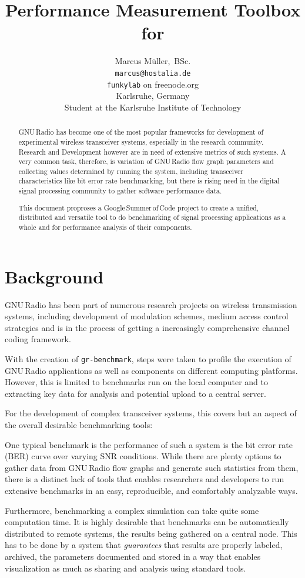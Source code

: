 \documentclass[a4paper]{IEEEtran}
\author{Marcus Müller,~BSc. \\[1.2em]%
{\scriptsize \texttt{marcus@hostalia.de}\\%
\texttt{funkylab} on freenode.org}\\[1.2em]%
%
{\footnotesize Karlsruhe, Germany\\Student at the Karlsruhe Institute of Technology}}
\title{Performance Measurement Toolbox for \gr}
\newcommand{\gr}{GNU\,Radio\xspace}
\newcommand{\gsoc}{Google\,Summer\,of\,Code\xspace}
\newcommand{\grbench}{\texttt{gr-benchmark}\xspace}
\begin{document}
\maketitle

\begin{abstract} \gr has become one of the most popular frameworks for
development of experimental wireless transceiver systems, especially in the
research community. Research and Development however are in need of extensive
metrics of such systems. A very common task, therefore, is variation of \gr
flow graph parameters and collecting values determined by running the system,
including transceiver characteristics like bit error rate benchmarking, but
there is rising need in the digital signal processing community to gather
software performance data.

This document proproses a \gsoc project to create a unified, distributed and
versatile tool to do benchmarking of signal processing applications as a whole
and for performance analysis of their components.  \end{abstract}

\section{Background} \gr has been part of numerous research projects on
wireless transmission systems, including development of modulation schemes,
medium access control strategies and is in the process of getting a
increasingly comprehensive channel coding framework.

With the creation of \grbench, steps were taken to profile the execution of \gr
applications as well as components on different computing platforms. However,
this is limited to benchmarks run on the local computer and to extracting key
data for analysis and potential upload to a central server\cite{grbenchmark}.

For the development of complex transceiver systems, this covers but an aspect
of the overall desirable benchmarking tools:

One typical benchmark is the performance of such a system is the bit error rate
(BER) curve over varying SNR conditions. While there are plenty options to
gather data from \gr flow graphs and generate such statistics from them, there
is a distinct lack of tools that enables researchers and developers to run
extensive benchmarks in an easy, reproducible, and comfortably analyzable ways. 

Furthermore, benchmarking a complex simulation can take quite some computation
time. It is highly desirable that benchmarks can be automatically distributed
to remote systems, the results being gathered on a central node. This has to be
done by a system that \emph{guarantees} that results are properly labeled,
archived, the parameters documented and stored in a way that enables
visualization as much as sharing and analysis using standard tools.
\end{document}
